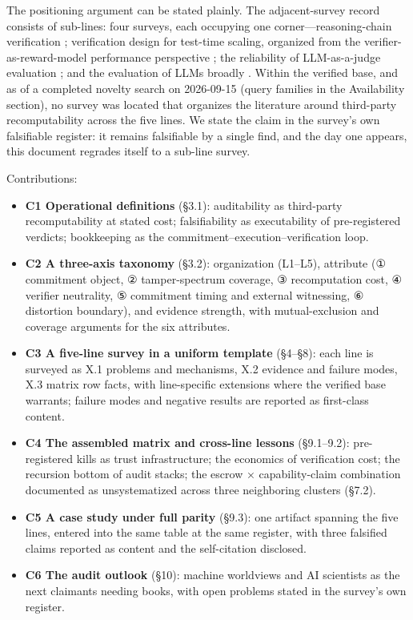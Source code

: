 \documentclass[11pt,a4paper]{article}
\begin{document}
The positioning argument can be stated plainly. The adjacent-survey record consists of sub-lines: four surveys, each occupying one corner—reasoning-chain verification \cite{key14}; verification design for test-time scaling, organized from the verifier-as-reward-model performance perspective \cite{key15}; the reliability of LLM-as-a-judge evaluation \cite{key16}; and the evaluation of LLMs broadly \cite{key17}. Within the verified base, and as of a completed novelty search on 2026-09-15 (query families in the Availability section), no survey was located that organizes the literature around third-party recomputability across the five lines. We state the claim in the survey's own falsifiable register: it remains falsifiable by a single find, and the day one appears, this document regrades itself to a sub-line survey.

Contributions:

\begin{itemize}[leftmargin=1.6em]
\item \textbf{C1 Operational definitions} (§3.1): auditability as third-party recomputability at stated cost; falsifiability as executability of pre-registered verdicts; bookkeeping as the commitment–execution–verification loop.
\item \textbf{C2 A three-axis taxonomy} (§3.2): organization (L1–L5), attribute (① commitment object, ② tamper-spectrum coverage, ③ recomputation cost, ④ verifier neutrality, ⑤ commitment timing and external witnessing, ⑥ distortion boundary), and evidence strength, with mutual-exclusion and coverage arguments for the six attributes.
\item \textbf{C3 A five-line survey in a uniform template} (§4–§8): each line is surveyed as X.1 problems and mechanisms, X.2 evidence and failure modes, X.3 matrix row facts, with line-specific extensions where the verified base warrants; failure modes and negative results are reported as first-class content.
\item \textbf{C4 The assembled matrix and cross-line lessons} (§9.1–9.2): pre-registered kills as trust infrastructure; the economics of verification cost; the recursion bottom of audit stacks; the escrow × capability-claim combination documented as unsystematized across three neighboring clusters (§7.2).
\item \textbf{C5 A case study under full parity} (§9.3): one artifact spanning the five lines, entered into the same table at the same register, with three falsified claims reported as content and the self-citation disclosed.
\item \textbf{C6 The audit outlook} (§10): machine worldviews and AI scientists as the next claimants needing books, with open problems stated in the survey's own register.
\end{itemize}
\end{document}
